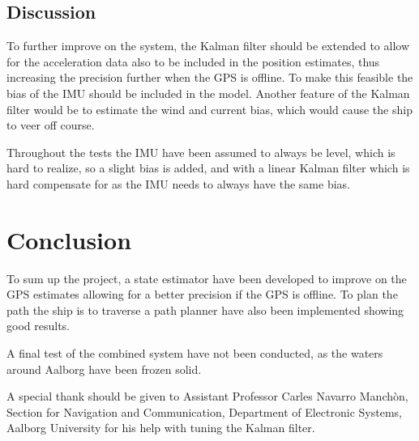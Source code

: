 \documentclass{ifacconf}
\begin{document}
\subsection{Discussion}
To further improve on the system, the Kalman filter should be extended to allow for the acceleration data also to be included in the position estimates, thus increasing the precision further when the GPS is offline. To make this feasible the bias of the IMU should be included in the model. Another feature of the Kalman filter would be to estimate the wind and current bias, which would cause the ship to veer off course. 

Throughout the tests the IMU have been assumed to always be level, which is hard to realize, so a slight bias is added, and with a linear Kalman filter which is hard compensate for as the IMU needs to always have the same bias.

\section{Conclusion}
To sum up the project, a state estimator have been developed to improve on the GPS estimates allowing for a better precision if the GPS is offline. To plan the path the ship is to traverse a path planner have also been implemented showing good results. 

A final test of the combined system have not been conducted, as the waters around Aalborg have been frozen solid. 

\begin{ack}                               %
A special thank should be given to Assistant Professor Carles Navarro Manchòn, Section for Navigation and Communication, Department of Electronic Systems, Aalborg University for his help with tuning the Kalman filter.  %
\end{ack}

%
\end{document}
